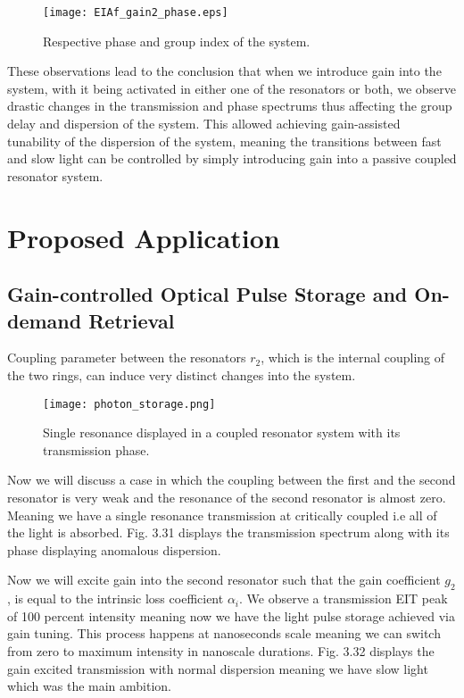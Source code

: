 \begin{figure}[h]
\centering
\texttt{[image: EIAf\_gain2\_phase.eps]}
\caption{Respective phase and group index of the system.}
\end{figure}

These observations lead to the conclusion that when we introduce gain into the system, with it being activated in either one of the resonators or both, we observe drastic changes in the transmission and phase spectrums thus affecting the group delay and dispersion of the system. This allowed achieving gain-assisted tunability of the dispersion of the system, meaning the transitions between fast and slow light can be controlled by simply introducing gain into a passive coupled resonator system.


\section{Proposed Application}
\subsection{Gain-controlled Optical Pulse Storage and On-demand Retrieval}
Coupling parameter between the resonators $r_{2}$, which is the internal coupling of the two rings, can induce very distinct changes into the system.

\begin{figure}[h]
\centering 
\texttt{[image: photon\_storage.png]}
\caption{Single resonance displayed in a coupled resonator system with its transmission phase.}
\end{figure}

Now we will discuss a case in which the coupling between the first and the second resonator is very weak and the resonance of the second resonator is almost zero. Meaning we have a single resonance transmission at critically coupled i.e all of the light is absorbed. Fig. 3.31 displays the transmission spectrum along with its phase displaying anomalous dispersion. 

Now we will excite gain into the second resonator such that the gain coefficient $g_{2}$, is equal to the intrinsic loss coefficient $\alpha_{i}$. We observe a transmission EIT peak of 100 percent intensity meaning now we have the light pulse storage achieved via gain tuning. This process happens at nanoseconds scale meaning we can switch from zero to maximum intensity in nanoscale durations. Fig. 3.32 displays the gain excited transmission with normal dispersion meaning we have slow light which was the main ambition.

